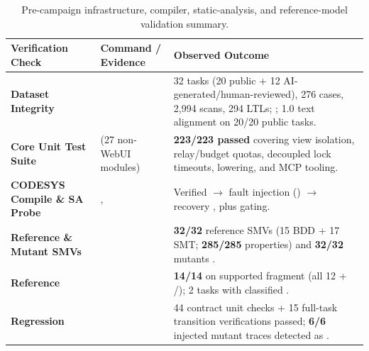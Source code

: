 \begin{table}[htbp]
\centering
\caption{Pre-campaign infrastructure, compiler, static-analysis, and reference-model validation summary.}
\label{tab:preflight}
\footnotesize
\begin{tabularx}{\textwidth}{@{}L{0.20\textwidth}L{0.31\textwidth}Y@{}}
\toprule
\textbf{Verification Check} & \textbf{Command / Evidence} & \textbf{Observed Outcome} \\
\midrule
\textbf{Dataset Integrity} &  & 32 tasks (20 public + 12 AI-generated/human-reviewed), 276 cases, 2,994 scans, 294 LTLs; ; 1.0 text alignment on 20/20 public tasks. \\
\textbf{Core Unit Test Suite} &  (27 non-WebUI modules) & \textbf{223/223 passed} covering view isolation, relay/budget quotas, decoupled lock timeouts,  lowering, and MCP tooling. \\
\textbf{CODESYS Compile \& SA Probe} & ,  & Verified  $\rightarrow$ fault injection  () $\rightarrow$ recovery , plus  gating. \\
\textbf{Reference \& Mutant SMVs} &  & \textbf{32/32} reference SMVs  (15  BDD + 17  SMT; \textbf{285/285} properties) and \textbf{32/32} mutants . \\
\textbf{Reference } &  & \textbf{14/14 } on supported fragment (all 12  + /); 2 tasks with  classified . \\
\textbf{ Regression} &  & 44 contract unit checks + 15 full-task transition verifications passed; \textbf{6/6} injected mutant traces detected as . \\
\bottomrule
\end{tabularx}
\end{table}

